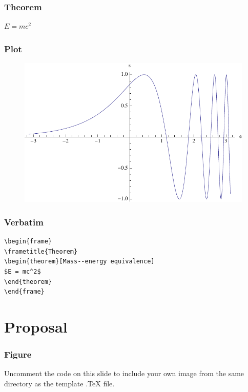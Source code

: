 \documentclass{beamer}
\begin{document}

\begin{frame}
\frametitle{Theorem}
\begin{theorem}
$E = mc^2$
\end{theorem}
\end{frame}


\begin{frame}
\frametitle{Plot}
\begin{figure} %
\centering
	\includegraphics[width=0.8\columnwidth]{../figures/sin_exp_plot.pdf}
\end{figure}
\end{frame}



\begin{frame}[fragile] %
\frametitle{Verbatim}
\begin{example}
\begin{verbatim}
\begin{frame}
\frametitle{Theorem}
\begin{theorem}[Mass--energy equivalence]
$E = mc^2$
\end{theorem}
\end{frame}\end{verbatim}
\end{example}
\end{frame}


\section{Proposal}

\begin{frame}
\frametitle{Figure}
Uncomment the code on this slide to include your own image from the same directory as the template .TeX file.
\end{frame}
\end{document}
